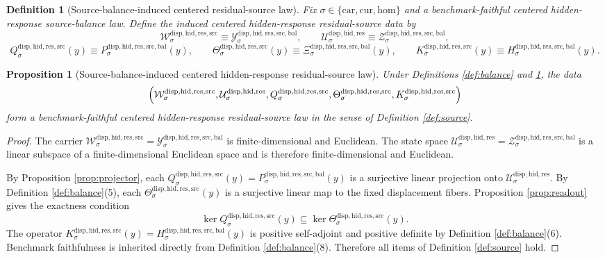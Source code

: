 \documentclass[11pt]{article}
\newcommand{\Car}{\mathrm{car}}
\newcommand{\Cur}{\mathrm{cur}}
\newcommand{\Hom}{\mathrm{hom}}
\newcommand{\ResidualState}[1]{\mathcal U_{#1}^{\mathrm{disp,hid,res}}}
\newcommand{\ResidualSourceCarrier}[1]{\mathcal W_{#1}^{\mathrm{disp,hid,res,src}}}
\newcommand{\ResidualSourceProjection}[1]{Q_{#1}^{\mathrm{disp,hid,res,src}}}
\newcommand{\ResidualSourceReadout}[1]{\Theta_{#1}^{\mathrm{disp,hid,res,src}}}
\newcommand{\ResidualSourceOperator}[1]{K_{#1}^{\mathrm{disp,hid,res,src}}}
\newcommand{\BalancedSourceCarrier}[1]{\mathcal Y_{#1}^{\mathrm{disp,hid,res,src,bal}}}
\newcommand{\SourceBalancedState}[1]{\mathcal Z_{#1}^{\mathrm{disp,hid,res,src,bal}}}
\newcommand{\SourceBalanceReadout}[1]{\Xi_{#1}^{\mathrm{disp,hid,res,src,bal}}}
\newcommand{\SourceBalanceResponse}[1]{H_{#1}^{\mathrm{disp,hid,res,src,bal}}}
\newcommand{\BalancedProjection}[1]{P_{#1}^{\mathrm{disp,hid,res,src,bal}}}
\newtheorem{definition}{Definition}
\newtheorem{proposition}{Proposition}
\begin{document}
\begin{definition}[Source-balance-induced centered residual-source law]
\label{def:induced}
Fix \(\sigma\in\{\Car,\Cur,\Hom\}\) and a benchmark-faithful centered hidden-response source-balance law. Define the induced centered hidden-response residual-source data by
\[
\ResidualSourceCarrier{\sigma}
\equiv
\BalancedSourceCarrier{\sigma},
\qquad
\ResidualState{\sigma}
\equiv
\SourceBalancedState{\sigma},
\]
\[
\ResidualSourceProjection{\sigma}(y)
\equiv
\BalancedProjection{\sigma}(y),
\qquad
\ResidualSourceReadout{\sigma}(y)
\equiv
\SourceBalanceReadout{\sigma}(y),
\qquad
\ResidualSourceOperator{\sigma}(y)
\equiv
\SourceBalanceResponse{\sigma}(y).
\]
\end{definition}

\begin{proposition}[Source-balance-induced centered hidden-response residual-source law]
\label{prop:source}
Under Definitions \ref{def:balance} and \ref{def:induced}, the data
\[
\Bigl(
\ResidualSourceCarrier{\sigma},
\ResidualState{\sigma},
\ResidualSourceProjection{\sigma},
\ResidualSourceReadout{\sigma},
\ResidualSourceOperator{\sigma}
\Bigr)
\]
form a benchmark-faithful centered hidden-response residual-source law in the sense of Definition \ref{def:source}.
\end{proposition}

\begin{proof}
The carrier \(\ResidualSourceCarrier{\sigma}=\BalancedSourceCarrier{\sigma}\) is finite-dimensional and Euclidean. The state space \(\ResidualState{\sigma}=\SourceBalancedState{\sigma}\) is a linear subspace of a finite-dimensional Euclidean space and is therefore finite-dimensional and Euclidean.

By Proposition \ref{prop:projector}, each \(\ResidualSourceProjection{\sigma}(y)=\BalancedProjection{\sigma}(y)\) is a surjective linear projection onto \(\ResidualState{\sigma}\). By Definition \ref{def:balance}(5), each \(\ResidualSourceReadout{\sigma}(y)\) is a surjective linear map to the fixed displacement fibers. Proposition \ref{prop:readout} gives the exactness condition
\[
\ker \ResidualSourceProjection{\sigma}(y)
\subseteq
\ker \ResidualSourceReadout{\sigma}(y).
\]
The operator \(\ResidualSourceOperator{\sigma}(y)=\SourceBalanceResponse{\sigma}(y)\) is positive self-adjoint and positive definite by Definition \ref{def:balance}(6). Benchmark faithfulness is inherited directly from Definition \ref{def:balance}(8). Therefore all items of Definition \ref{def:source} hold.
\end{proof}
\end{document}
